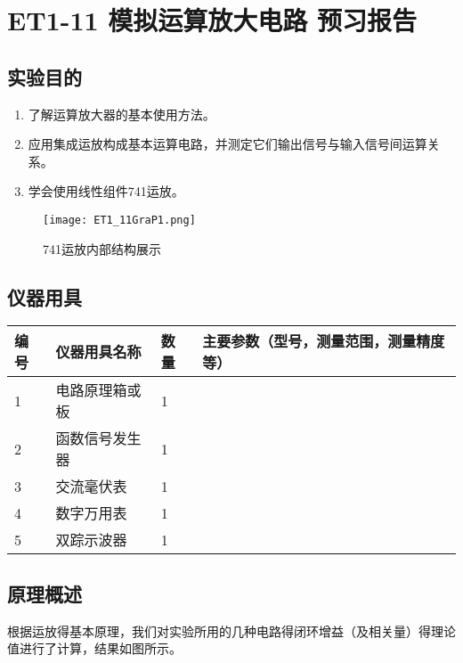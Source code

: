 \documentclass[dvipsnames, svgnames,a4paper,11pt]{article}
\begin{document}
	
	
	
	\setcounter{section}{0}
	\section{ET1-11 模拟运算放大电路 \quad\heiti 预习报告}
	
	\subsection{实验目的}
	\begin{enumerate}
		\item 了解运算放大器的基本使用方法。
		\item 应用集成运放构成基本运算电路，并测定它们输出信号与输入信号间运算关系。
		\item 学会使用线性组件741运放。 		
	\end{enumerate}
	
	\begin{figure}[htbp]
		\centering
		\texttt{[image: ET1\_11GraP1.png]}
		\caption{741运放内部结构展示}
		\label{fig:figP1}
	\end{figure}
	
	\subsection{仪器用具}
	\begin{table}[htbp]
		\centering
		\renewcommand\arraystretch{1.6}
		\begin{tabular}{p{}|p{}|p{}|p{}}
			\hline
			编号& 仪器用具名称 & 数量 &  主要参数（型号，测量范围，测量精度等） \\
			\hline
			1&  电路原理箱或板& 1 &  \\
			\hline
			2&  函数信号发生器& 1 &  \\
			\hline
			3&  交流毫伏表& 1 &  \\
			\hline
			4&  数字万用表& 1 &  \\
			\hline
			5&  双踪示波器& 1 &  \\
			\hline
		\end{tabular}
	\end{table}
	
	\subsection{原理概述}
	根据运放得基本原理，我们对实验所用的几种电路得闭环增益（及相关量）得理论值进行了计算，结果如图所示。
	
\end{document}
